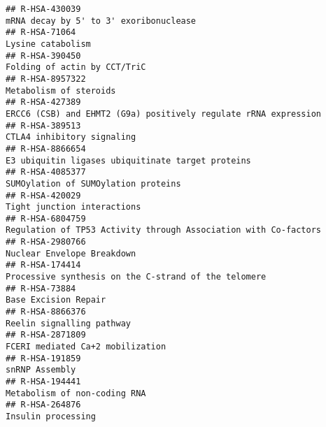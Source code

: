 \documentclass[
]{article}
\begin{document}
\begin{verbatim}
## R-HSA-430039                                                                                                mRNA decay by 5' to 3' exoribonuclease
## R-HSA-71064                                                                                                                      Lysine catabolism
## R-HSA-390450                                                                                                          Folding of actin by CCT/TriC
## R-HSA-8957322                                                                                                               Metabolism of steroids
## R-HSA-427389                                                                       ERCC6 (CSB) and EHMT2 (G9a) positively regulate rRNA expression
## R-HSA-389513                                                                                                            CTLA4 inhibitory signaling
## R-HSA-8866654                                                                                    E3 ubiquitin ligases ubiquitinate target proteins
## R-HSA-4085377                                                                                                  SUMOylation of SUMOylation proteins
## R-HSA-420029                                                                                                           Tight junction interactions
## R-HSA-6804759                                                                      Regulation of TP53 Activity through Association with Co-factors
## R-HSA-2980766                                                                                                           Nuclear Envelope Breakdown
## R-HSA-174414                                                                                  Processive synthesis on the C-strand of the telomere
## R-HSA-73884                                                                                                                   Base Excision Repair
## R-HSA-8866376                                                                                                            Reelin signalling pathway
## R-HSA-2871809                                                                                                     FCERI mediated Ca+2 mobilization
## R-HSA-191859                                                                                                                        snRNP Assembly
## R-HSA-194441                                                                                                          Metabolism of non-coding RNA
## R-HSA-264876                                                                                                                    Insulin processing

\end{verbatim}
\end{document}
